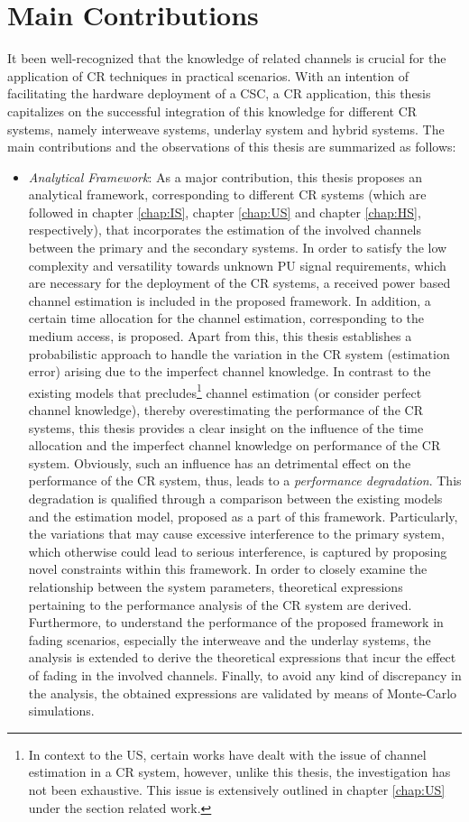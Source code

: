 \section{Main Contributions}
It been well-recognized that the knowledge of related channels is crucial for the application of CR techniques in practical scenarios. With an intention of facilitating the hardware deployment of a CSC, a CR application, this thesis capitalizes on the successful integration of this knowledge for different CR systems, namely interweave systems, underlay system and hybrid systems. The main contributions and the observations of this thesis are summarized as follows:
\begin{itemize}
\item \textit{Analytical Framework}: 
As a major contribution, this thesis proposes an analytical framework, corresponding to different CR systems (which are followed in chapter \ref{chap:IS}, chapter \ref{chap:US} and chapter \ref{chap:HS}, respectively), that incorporates the estimation of the involved channels between the primary and the secondary systems. In order to satisfy the low complexity and versatility towards unknown PU signal requirements, which are necessary for the deployment of the CR systems, a received power based channel estimation is included in the proposed framework. In addition, a certain time allocation for the channel estimation, corresponding to the medium access, is proposed. Apart from this, this thesis establishes a probabilistic approach to handle the variation in the CR system (estimation error) arising due to the imperfect channel knowledge. In contrast to the existing models that precludes\footnote{In context to the US, certain works have dealt with the issue of channel estimation in a CR system, however, unlike this thesis, the investigation has not been exhaustive. This issue is extensively outlined in chapter \ref{chap:US} under the section related work.} channel estimation (or consider perfect channel knowledge), thereby overestimating the performance of the CR systems, this thesis provides a clear insight on the influence of the time allocation and the imperfect channel knowledge on performance of the CR system. Obviously, such an influence has an detrimental effect on the performance of the CR system, thus, leads to a \textit{performance degradation}. This degradation is qualified through a comparison between the existing models and the estimation model, proposed as a part of this framework. Particularly, the variations that may cause excessive interference to the primary system, which otherwise could lead to serious interference, is captured by proposing novel constraints within this framework. In order to closely examine the relationship between the system parameters, theoretical expressions pertaining to the performance analysis of the CR system are derived. Furthermore, to understand the performance of the proposed framework in fading scenarios, especially the interweave and the underlay systems, the analysis is extended to derive the theoretical expressions that incur the effect of fading in the involved channels. Finally, to avoid any kind of discrepancy in the analysis, the obtained expressions are validated by means of Monte-Carlo simulations. 

\end{itemize}
